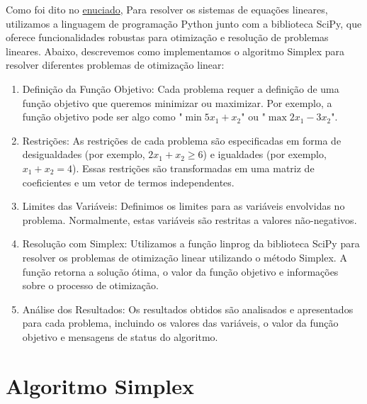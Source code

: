 \documentclass[11pt]{article}
\theoremstyle{definition} \newtheorem{definition}{Definição}
\theoremstyle{definition} \newtheorem{example}{Exemplo}
\begin{document}
{Como foi dito no \href{https://cdn.discordapp.com/attachments/990092066694524980/1251955505941839892/projeto2.pdf?ex=667075ec&is=666f246c&hm=c3939979dac83efa757c6360efbd0db8b65ccf560cd1109bc99dcf5f84f42808&}{enuciado}, Para resolver os sistemas de equações lineares, utilizamos a linguagem de programação Python junto com a biblioteca SciPy, que oferece funcionalidades robustas para otimização e resolução de problemas lineares. Abaixo, descrevemos como implementamos o algoritmo Simplex para resolver diferentes problemas de otimização linear:}
\begin{enumerate}
    \item Definição da Função Objetivo: Cada problema requer a definição de uma função objetivo que queremos minimizar ou maximizar. Por exemplo, a função objetivo pode ser algo como "\(\min{ 5x_1 + x_2}\)" ou "\(\max 2x_1 - 3x_2\)".
    \item Restrições: As restrições de cada problema são especificadas em forma de desigualdades (por exemplo, \(2x_1 + x_2 \geq 6\)) e igualdades (por exemplo, \(x_1 + x_2 = 4\)). Essas restrições são transformadas em uma matriz de coeficientes e um vetor de termos independentes.
    \item Limites das Variáveis: Definimos os limites para as variáveis envolvidas no problema. Normalmente, estas variáveis são restritas a valores não-negativos.
    \item Resolução com Simplex: Utilizamos a função linprog da biblioteca SciPy para resolver os problemas de otimização linear utilizando o método Simplex. A função retorna a solução ótima, o valor da função objetivo e informações sobre o processo de otimização.
    \item Análise dos Resultados: Os resultados obtidos são analisados e apresentados para cada problema, incluindo os valores das variáveis, o valor da função objetivo e mensagens de status do algoritmo.
\end{enumerate}

\section{Algoritmo Simplex}
\end{document}
